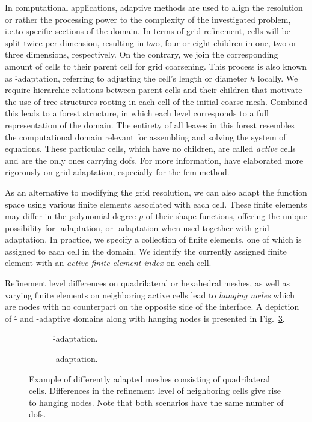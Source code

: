 In computational applications, adaptive methods are used to align the resolution or rather the processing power to the complexity of the investigated problem, i.e.\@ to specific sections of the domain. In terms of grid refinement, cells will be split twice per dimension, resulting in two, four or eight children in one, two or three dimensions, respectively. On the contrary, we join the corresponding amount of cells to their parent cell for grid coarsening. This process is also known as \h-adaptation, referring to adjusting the cell's length or diameter \(h\) locally. We require hierarchic relations between parent cells and their children that motivate the use of tree structures rooting in each cell of the initial coarse mesh. Combined this leads to a forest structure, in which each level corresponds to a full representation of the domain. The entirety of all leaves in this forest resembles the computational domain relevant for assembling and solving the system of equations. These particular cells, which have no children, are called \textit{active} cells and are the only ones carrying \glspl{dof}. For more information, \textcite{bangerth2003} have elaborated more rigorously on grid adaptation, especially for the \gls{fem} method.

As an alternative to modifying the grid resolution, we can also adapt the function space using various finite elements associated with each cell. These finite elements may differ in the polynomial degree $p$ of their shape functions, offering the unique possibility for \p-adaptation, or \hp-adaptation when used together with grid adaptation. In practice, we specify a collection of finite elements, one of which is assigned to each cell in the domain. We identify the currently assigned finite element with an \textit{active finite element index} on each cell.

Refinement level differences on quadrilateral or hexahedral meshes, as well as varying finite elements on neighboring active cells lead to \textit{hanging nodes} which are nodes with no counterpart on the opposite side of the interface. A depiction of \h- and \p-adaptive domains along with hanging nodes is presented in Fig.~\ref{fig:hpadaptivity}.

\begin{figure}
\begin{subfigure}{0.49\textwidth}
  \centering
  
  \caption{\h-adaptation.}
  \label{fig:hapaptivity}
\end{subfigure}
\begin{subfigure}{0.49\textwidth}
  \centering
  
  \caption{\p-adaptation.}
  \label{fig:papaptivity}
\end{subfigure}
\caption{Example of differently adapted meshes consisting of quadrilateral cells. Differences in the refinement level of neighboring cells give rise to hanging nodes. Note that both scenarios have the same number of \glspl{dof}.}
\label{fig:hpadaptivity}
\end{figure}

